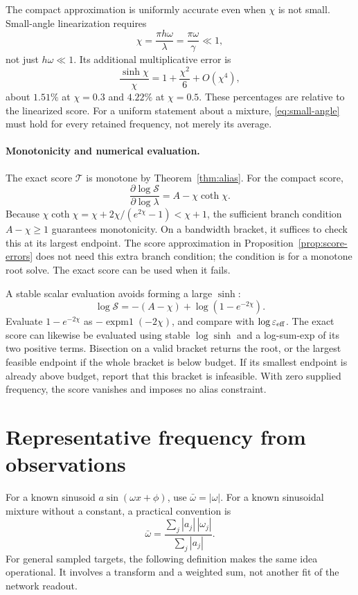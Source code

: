 \documentclass[11pt]{article}
\theoremstyle{definition}\newtheorem{definition}[theorem]{Definition}
\theoremstyle{remark}\newtheorem{remark}[theorem]{Remark}
\numberwithin{equation}{section}
\newcommand{\T}{\mathcal T}
\newcommand{\Sscore}{\mathcal S}
\begin{document}
The compact approximation is uniformly accurate even when $\chi$ is not small. Small-angle linearization requires
\begin{equation}
 \chi=\frac{\pi h\omega}{\lambda}=\frac{\pi\omega}{\gamma}\ll1,
 \label{eq:small-angle}
\end{equation}
not just $h\omega\ll1$. Its additional multiplicative error is
\[
 \frac{\sinh\chi}{\chi}=1+\frac{\chi^2}{6}+O(\chi^4),
\]
about $1.51\%$ at $\chi=0.3$ and $4.22\%$ at $\chi=0.5$. These percentages are relative to the linearized score. For a uniform statement about a mixture, \eqref{eq:small-angle} must hold for every retained frequency, not merely its average.

\paragraph{Monotonicity and numerical evaluation.}
The exact score $\T$ is monotone by Theorem~\ref{thm:alias}. For the compact score,
\begin{equation}
 \frac{\partial\log\Sscore}{\partial\log\lambda}
 =A-\chi\coth\chi.
 \label{eq:compact-slope}
\end{equation}
Because $\chi\coth\chi=\chi+2\chi/(e^{2\chi}-1)<\chi+1$, the sufficient branch condition $A-\chi\ge1$ guarantees monotonicity. On a bandwidth bracket, it suffices to check this at its largest endpoint. The score approximation in Proposition~\ref{prop:score-errors} does not need this extra branch condition; the condition is for a monotone root solve. The exact score can be used when it fails.

A stable scalar evaluation avoids forming a large $\sinh$:
\begin{equation}
 \log\Sscore=-(A-\chi)+\log(1-e^{-2\chi}).
 \label{eq:log-score}
\end{equation}
Evaluate $1-e^{-2\chi}$ as $-\operatorname{expm1}(-2\chi)$, and compare with $\log\varepsilon_{\rm eff}$. The exact score can likewise be evaluated using stable $\log\sinh$ and a log-sum-exp of its two positive terms. Bisection on a valid bracket returns the root, or the largest feasible endpoint if the whole bracket is below budget. If its smallest endpoint is already above budget, report that this bracket is infeasible. With zero supplied frequency, the score vanishes and imposes no alias constraint.

\section{Representative frequency from observations}
\label{sec:frequency}
For a known sinusoid $a\sin(\omega x+\phi)$, use $\bar\omega=|\omega|$. For a known sinusoidal mixture without a constant, a practical convention is
\begin{equation}
 \bar\omega=\frac{\sum_j|a_j|\,|\omega_j|}{\sum_j|a_j|}.
 \label{eq:known-mean}
\end{equation}
For general sampled targets, the following definition makes the same idea operational. It involves a transform and a weighted sum, not another fit of the network readout.
\end{document}

